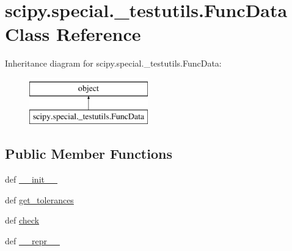 \hypertarget{classscipy_1_1special_1_1__testutils_1_1FuncData}{}\section{scipy.\+special.\+\_\+testutils.\+Func\+Data Class Reference}
\label{classscipy_1_1special_1_1__testutils_1_1FuncData}
Inheritance diagram for scipy.\+special.\+\_\+testutils.\+Func\+Data\+:\begin{figure}[H]
\begin{center}
\leavevmode
\includegraphics[height=2.000000cm]{classscipy_1_1special_1_1__testutils_1_1FuncData}
\end{center}
\end{figure}
\subsection*{Public Member Functions}
\begin{DoxyCompactItemize}
\item 
def \hyperlink{classscipy_1_1special_1_1__testutils_1_1FuncData_a77c2591d1f290105364dadb100c592fb}{\+\_\+\+\_\+init\+\_\+\+\_\+}
\item 
def \hyperlink{classscipy_1_1special_1_1__testutils_1_1FuncData_a6d1719564b030a404304c1bb0d4c0136}{get\+\_\+tolerances}
\item 
def \hyperlink{classscipy_1_1special_1_1__testutils_1_1FuncData_a620b47aa7136f63d26dd58ad460bc0b8}{check}
\item 
def \hyperlink{classscipy_1_1special_1_1__testutils_1_1FuncData_a004c00f567e9c84d98b6d1dc064bf5ab}{\+\_\+\+\_\+repr\+\_\+\+\_\+}
\end{DoxyCompactItemize}
